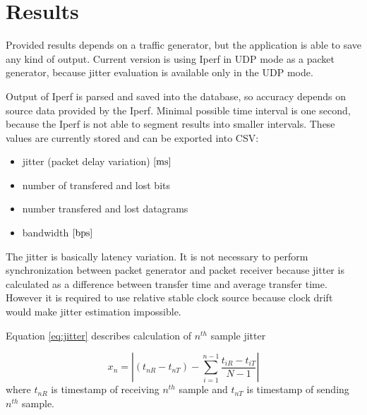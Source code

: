 \section{Results}
Provided results depends on a traffic generator, but the application is able to save any kind of output. Current version is using Iperf in \Ac{UDP} mode as a packet generator, because jitter evaluation is available only in the \Ac{UDP} mode. 

Output of Iperf is parsed and saved into the database, so accuracy depends on source data provided by the Iperf. 
Minimal possible time interval is one second, because the Iperf is not able to segment results into smaller intervals.
These values are currently stored and can be exported into \Ac{CSV}:
\begin{itemize}
	\item jitter (packet delay variation) $[\mathrm{ms}]$
	\item number of transfered and lost bits
	\item number transfered and lost datagrams
	\item bandwidth $[\mathrm{bps}]$
\end{itemize}

The jitter is basically latency variation. It is not necessary to perform synchronization between packet generator and packet receiver because jitter is calculated as a difference between transfer time and average transfer time. However it is required to use relative stable clock source because clock drift would make jitter estimation impossible.

Equation \ref{eq:jitter} describes calculation of $n^{th}$ sample jitter

\begin{equation}
x_n = \left | (t_{nR} - t_{nT}) - \sum_{i=1}^{n-1} \frac{t_{iR} - t_{iT}}{N-1} \right |
\label{eq:jitter}
\end{equation}
where $t_{nR}$ is timestamp of receiving $n^{th}$ sample and $t_{nT}$ is timestamp of sending $n^{th}$ sample.


